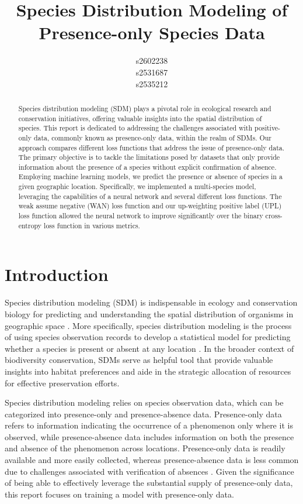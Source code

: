 \documentclass{article}
\title{Species Distribution Modeling of Presence-only Species Data}
\author{
  s2602238\\
  \And
  s2531687\\
 \And
  s2535212\\
}
\begin{document}
\maketitle

\begin{abstract}
 Species distribution modeling (SDM) plays a pivotal role in ecological research and conservation initiatives, offering valuable insights into the spatial distribution of species. This report is dedicated to addressing the challenges associated with positive-only data, commonly known as presence-only data, within the realm of SDMs. Our approach compares different loss functions that address the issue of presence-only data. The primary objective is to tackle the limitations posed by datasets that only provide information about the presence of a species without explicit confirmation of absence. Employing machine learning models, we predict the presence or absence of species in a given geographic location. Specifically, we implemented a multi-species model, leveraging the capabilities of a neural network and several different loss functions. The weak assume negative (WAN) loss function and our up-weighting positive label (UPL) loss function allowed the neural network to improve significantly over the binary cross-entropy loss function in various metrics. 
\end{abstract}

\section{Introduction}
Species distribution modeling (SDM) is indispensable in ecology and conservation biology for predicting and understanding the spatial distribution of organisms in geographic space \cite{review, rareplants}. More specifically, species distribution modeling is the process of using species observation records to develop a statistical model for predicting whether a species is present or absent at any location \cite{spatial}. In the broader context of biodiversity conservation, SDMs serve as helpful tool that provide valuable insights into habitat preferences and aide in the strategic allocation of resources for effective preservation efforts.

Species distribution modeling relies on species observation data, which can be categorized into presence-only and presence-absence data. Presence-only data refers to information indicating the occurrence of a phenomenon only where it is observed, while presence-absence data includes information on both the presence and absence of the phenomenon across locations. Presence-only data is readily available and more easily collected, whereas presence-absence data is less common due to challenges associated with verification of absences \cite{spatial, review, presence-onlyEM}. Given the significance of being able to effectively leverage the substantial supply of presence-only data, this report focuses on training a model with presence-only data. 
\end{document}
